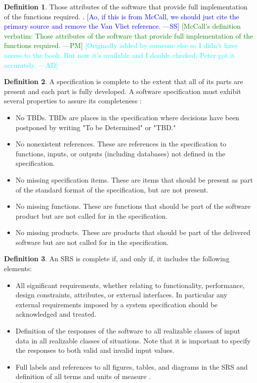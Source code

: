 \documentclass[letterpaper, cleveref]{lipics-v2019}
\newcommand{\authornote}[3]{\textcolor{#1}{[#3 ---#2]}}
\newcommand{\authornote}[3]{}
\newcommand{\wss}[1]{\authornote{blue}{SS}{#1}} %
\newcommand{\pmi}[1]{\authornote{green}{PM}{#1}} %
\newcommand{\ad}[1]{\authornote{cyan}{AD}{#1}} %
\theoremstyle{definition}
\newtheorem{defn}{Definition}
\begin{document}
\begin{defn}
  Those attributes of the software that provide full implementation of the
  functions required. \citep{McCallEtAl1977}. \wss{Ao, if this is from McCall,
  we should just cite the primary source and remove the Van Vliet reference.}
  \pmi{McCall's definition verbatim: Those attributes of the software that
  provide full implementation of the functions required.} \ad{Originally added
  by someone else so I didn't have access to the book. But now it's available
  and I double checked, Peter got it accurately.}
\end{defn}

\begin{defn}
  \label{CompletenessSelected} A specification is complete to the extent
  that all of its parts are present and each part is fully developed. A
  software specification must exhibit several properties to assure its
  completeness \citep{Boehm1984}:
  \begin{itemize}
  \item No TBDs. TBDs are places in the specification where decisions have been
    postponed by writing "To be Determined" or "TBD."
  \item No nonexistent references. These are references in the specification to
    functions, inputs, or outputs (including databases) not defined in the
    specification.
  \item No missing specification items. These are items that should be present
    as part of the standard format of the specification, but are not present.
  \item No missing functions. These are functions that should be part of the
    software product but are not called for in the specification.
  \item No missing products. These are products that should be part of the
    delivered software but are not called for in the specification.
  \end{itemize}
\end{defn}

\begin{defn}
	An SRS is complete if, and only if, it includes the following elements:
\begin{itemize}
\item All significant requirements, whether relating to functionality,
performance, design constraints, attributes, or external interfaces. In
particular any external requirements imposed by a system specification should be
acknowledged and treated.
\item Definition of the responses of the software to all realizable classes of
input data in all realizable classes of situations. Note that it is important to
specify the responses to both valid and invalid input values.
\item Full labels and references to all figures, tables, and diagrams in the SRS
and definition of all terms and units of measure \citep{IEEE1998}.
	\end{itemize}
\end{defn}
\end{document}
